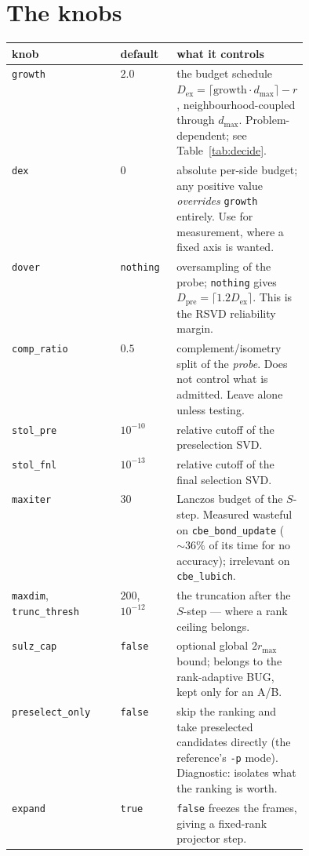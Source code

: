 \documentclass[11pt,a4paper]{article}
\newcommand{\Dex}{D_{\mathrm{ex}}}
\newcommand{\Dpre}{D_{\mathrm{pre}}}
\newcommand{\code}[1]{\texttt{\small #1}}
\begin{document}
\section{The knobs}

\begin{center}
\begin{tabular}{@{}llp{0.44\linewidth}@{}}
\toprule
knob & default & what it controls \\
\midrule
\code{growth} & $2.0$ & the budget schedule
$\Dex = \lceil \text{growth}\cdot d_{\max}\rceil - r$, neighbourhood-coupled through
$d_{\max}$. Problem-dependent; see Table~\ref{tab:decide}. \\
\code{dex} & $0$ & absolute per-side budget; any positive value \emph{overrides}
\code{growth} entirely. Use for measurement, where a fixed axis is wanted. \\
\code{dover} & \code{nothing} & oversampling of the probe; \code{nothing} gives
$\Dpre = \lceil 1.2 \Dex\rceil$. This is the RSVD reliability margin. \\
\code{comp\_ratio} & $0.5$ & complement/isometry split of the \emph{probe}. Does not control
what is admitted. Leave alone unless testing. \\
\code{stol\_pre} & $10^{-10}$ & relative cutoff of the preselection SVD. \\
\code{stol\_fnl} & $10^{-13}$ & relative cutoff of the final selection SVD. \\
\code{maxiter} & $30$ & Lanczos budget of the $S$-step. Measured wasteful on
\code{cbe\_bond\_update} ($\sim36\%$ of its time for no accuracy); irrelevant on
\code{cbe\_lubich}. \\
\code{maxdim}, \code{trunc\_thresh} & $200$, $10^{-12}$ & the truncation after the $S$-step ---
where a rank ceiling belongs. \\
\code{sulz\_cap} & \code{false} & optional global $2r_{\max}$ bound; belongs to the
rank-adaptive BUG, kept only for an A/B. \\
\code{preselect\_only} & \code{false} & skip the ranking and take preselected candidates
directly (the reference's \code{-p} mode). Diagnostic: isolates what the ranking is worth. \\
\code{expand} & \code{true} & \code{false} freezes the frames, giving a fixed-rank projector
step. \\
\bottomrule
\end{tabular}
\end{center}

\end{document}

